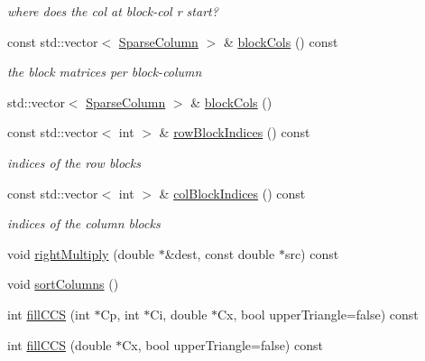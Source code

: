 \begin{DoxyCompactItemize}
\begin{DoxyCompactList}\small\item\em where does the col at block-\/col r start? \end{DoxyCompactList}\item 
const std\+::vector$<$ \mbox{\hyperlink{classg2o_1_1_sparse_block_matrix_c_c_s_a4fc5dfe0a9ff9bd62065ca4b17f25bc1}{Sparse\+Column}} $>$ \& \mbox{\hyperlink{classg2o_1_1_sparse_block_matrix_c_c_s_a30586863195a37c6ac87d7fb17376ee7}{block\+Cols}} () const
\begin{DoxyCompactList}\small\item\em the block matrices per block-\/column \end{DoxyCompactList}\item 
std\+::vector$<$ \mbox{\hyperlink{classg2o_1_1_sparse_block_matrix_c_c_s_a4fc5dfe0a9ff9bd62065ca4b17f25bc1}{Sparse\+Column}} $>$ \& \mbox{\hyperlink{classg2o_1_1_sparse_block_matrix_c_c_s_a5a9ef3cd8399a335edec8b7e934192b8}{block\+Cols}} ()
\item 
const std\+::vector$<$ int $>$ \& \mbox{\hyperlink{classg2o_1_1_sparse_block_matrix_c_c_s_aafbd3a59409bcf2d518cda71d8a33229}{row\+Block\+Indices}} () const
\begin{DoxyCompactList}\small\item\em indices of the row blocks \end{DoxyCompactList}\item 
const std\+::vector$<$ int $>$ \& \mbox{\hyperlink{classg2o_1_1_sparse_block_matrix_c_c_s_adfc832a66dc5437ebb2d820b0a1104b9}{col\+Block\+Indices}} () const
\begin{DoxyCompactList}\small\item\em indices of the column blocks \end{DoxyCompactList}\item 
void \mbox{\hyperlink{classg2o_1_1_sparse_block_matrix_c_c_s_ade50ae61556e057549a64962b55ec194}{right\+Multiply}} (double $\ast$\&dest, const double $\ast$src) const
\item 
void \mbox{\hyperlink{classg2o_1_1_sparse_block_matrix_c_c_s_a6500e67cc29b3fe51bc40930d97d0ac5}{sort\+Columns}} ()
\item 
int \mbox{\hyperlink{classg2o_1_1_sparse_block_matrix_c_c_s_a1751f9966ed8ab54d5a2942388407261}{fill\+C\+CS}} (int $\ast$Cp, int $\ast$Ci, double $\ast$Cx, bool upper\+Triangle=false) const
\item 
int \mbox{\hyperlink{classg2o_1_1_sparse_block_matrix_c_c_s_a6bb0a7087552ec2d777c64de43d955f1}{fill\+C\+CS}} (double $\ast$Cx, bool upper\+Triangle=false) const
\end{DoxyCompactItemize}
